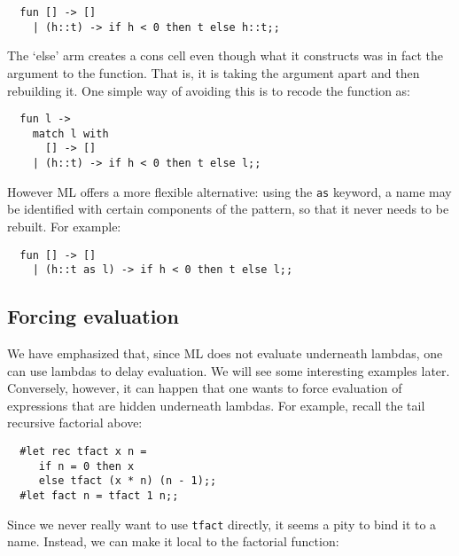\begin{boxed}\begin{verbatim}
  fun [] -> []
    | (h::t) -> if h < 0 then t else h::t;;
\end{verbatim}\end{boxed}

The `else' arm creates a cons cell even though what it constructs was in fact
the argument to the function. That is, it is taking the argument apart and then
rebuilding it. One simple way of avoiding this is to recode the function as:

\begin{boxed}\begin{verbatim}
  fun l ->
    match l with
      [] -> []
    | (h::t) -> if h < 0 then t else l;;
\end{verbatim}\end{boxed}

However ML offers a more flexible alternative: using the {\tt as} keyword, a
name may be identified with certain components of the pattern, so that it never
needs to be rebuilt. For example:

\begin{boxed}\begin{verbatim}
  fun [] -> []
    | (h::t as l) -> if h < 0 then t else l;;
\end{verbatim}\end{boxed}

\subsection{Forcing evaluation}

We have emphasized that, since ML does not evaluate underneath lambdas, one can
use lambdas to delay evaluation. We will see some interesting examples later.
Conversely, however, it can happen that one wants to force evaluation of
expressions that are hidden underneath lambdas. For example, recall the tail
recursive factorial above:

\begin{boxed}\begin{verbatim}
  #let rec tfact x n =
     if n = 0 then x
     else tfact (x * n) (n - 1);;
  #let fact n = tfact 1 n;;
\end{verbatim}\end{boxed}

Since we never really want to use {\tt tfact} directly, it seems a pity to bind
it to a name. Instead, we can make it local to the factorial function:

